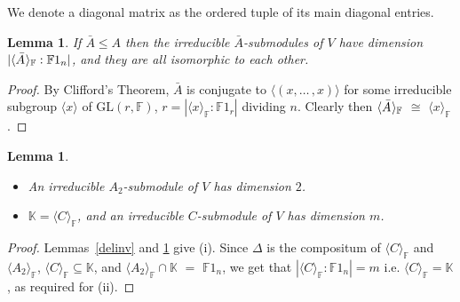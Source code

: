 \documentclass[12pt]{amsart}
\newtheorem{lemma}[theorem]{Lemma}
\theoremstyle{definition}
\theoremstyle{remark}
\begin{document}
We denote a diagonal matrix as the ordered tuple of its main
diagonal entries.
\begin{lemma}
\label{prea2c}
If $\bar{A}\leq A$ then the irreducible $\bar{A}$-submodules
 of $V$ have dimension $|\langle \bar{A} \hspace*{.2mm} 
 \rangle_{\mathbb{F}} : \mathbb{F}1_n|$, 
and they are all isomorphic to each other.
\end{lemma}
\begin{proof}
 By Clifford's Theorem,  
 $\bar{A}$ is conjugate to  
 $\langle (x, \ldots \, \! , x) \rangle$ 
 for some irreducible subgroup $\langle x \rangle$
 of $\mathrm{GL}(r, \mathbb{F})$,
 $r=|\langle x\rangle_{\mathbb{F}}:\mathbb{F}1_{r}|$ 
 dividing $n$. 
 Clearly then $\langle \bar{A} \hspace*{.2mm} 
 \rangle_{\mathbb{F}}$ $\cong$ 
 $\langle  x\rangle_{\mathbb{F}}$.    
\end{proof}
\begin{lemma} 
\label{a2cirred}
\begin{itemize}
\item[{\rm (i)}] 
 An irreducible $A_2$-submodule of $V$ has
 dimension $2$.
\item[{\rm (ii)}] 
 $\mathbb{K} = \langle C\rangle_\mathbb{F}$, and an 
 irreducible $C$-submodule of $V$ has dimension 
 $m$.
\end{itemize}
\end{lemma}
\begin{proof}
 Lemmas~\ref{delinv} and \ref{prea2c} give (i).
 Since $\Delta$ is the  compositum of 
 $\langle C\rangle_{\mathbb{F}}$ and  
 $\langle A_2\rangle_{\mathbb{F}}$,  
 $\langle C\rangle_\mathbb{F}\subseteq \mathbb{K}$, and
 $\langle A_2\rangle_{\mathbb{F}} \cap \mathbb{K}$ 
 $=$ $\mathbb{F}1_n$, we get that
 $|\langle C \rangle_\mathbb{F}  : \mathbb{F}1_n| =m$
 i.e. $\langle C\rangle_\mathbb{F}=\mathbb{K}$,
 as required for (ii). 
\end{proof}
\end{document}
